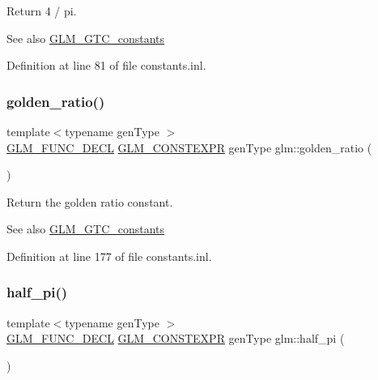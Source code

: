 Return 4 / pi. \begin{DoxySeeAlso}{See also}
\mbox{\hyperlink{group__gtc__constants}{G\+L\+M\+\_\+\+G\+T\+C\+\_\+constants}} 
\end{DoxySeeAlso}


Definition at line 81 of file constants.\+inl.

\mbox{\label{group__gtc__constants_ga748cf8642830657c5b7eae04d0a80899}} 
\subsubsection{\texorpdfstring{golden\_ratio()}{golden\_ratio()}}
{\footnotesize\ttfamily template$<$typename gen\+Type $>$ \\
\mbox{\hyperlink{setup_8hpp_ab2d052de21a70539923e9bcbf6e83a51}{G\+L\+M\+\_\+\+F\+U\+N\+C\+\_\+\+D\+E\+CL}} \mbox{\hyperlink{setup_8hpp_a08b807947b47031d3a511f03f89645ad}{G\+L\+M\+\_\+\+C\+O\+N\+S\+T\+E\+X\+PR}} gen\+Type glm\+::golden\+\_\+ratio (\begin{DoxyParamCaption}{ }\end{DoxyParamCaption})}

Return the golden ratio constant. \begin{DoxySeeAlso}{See also}
\mbox{\hyperlink{group__gtc__constants}{G\+L\+M\+\_\+\+G\+T\+C\+\_\+constants}} 
\end{DoxySeeAlso}


Definition at line 177 of file constants.\+inl.

\mbox{\label{group__gtc__constants_ga0c36b41d462e45641faf7d7938948bac}} 
\subsubsection{\texorpdfstring{half\_pi()}{half\_pi()}}
{\footnotesize\ttfamily template$<$typename gen\+Type $>$ \\
\mbox{\hyperlink{setup_8hpp_ab2d052de21a70539923e9bcbf6e83a51}{G\+L\+M\+\_\+\+F\+U\+N\+C\+\_\+\+D\+E\+CL}} \mbox{\hyperlink{setup_8hpp_a08b807947b47031d3a511f03f89645ad}{G\+L\+M\+\_\+\+C\+O\+N\+S\+T\+E\+X\+PR}} gen\+Type glm\+::half\+\_\+pi (\begin{DoxyParamCaption}{ }\end{DoxyParamCaption})}


